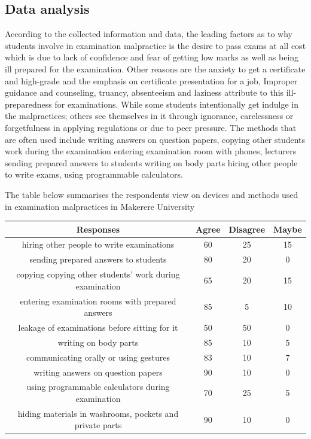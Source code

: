 \documentclass [8 pt]{article}
\begin{document}
\subsection {Data analysis}
According to the collected information and data, the leading factors as to why students involve in examination malpractice is the desire to pass exams at all cost which is due to lack of confidence and fear of getting low marks as well as being ill prepared for the examination. Other reasons are the anxiety to get a certificate and high-grade and the emphasis on certificate presentation for a job, Improper guidance and counseling, truancy, absenteeism and laziness attribute to this ill-preparedness for examinations. 
\newline While some students intentionally get indulge in the malpractices; others see themselves in it through ignorance, carelessness or forgetfulness in applying regulations or due to peer pressure. The methods that are often used include writing answers on question papers, copying other students work during the examination entering examination room with phones, lecturers sending prepared answers to students writing on body parts hiring other people to write exams, using programmable calculators. 

The table below summarises the respondents view on devices and methods used in examination malpractices in Makerere University 

\begin{center}
\begin{tabular}{||c |c |c |c||}
\hline Responses & Agree & Disagree & Maybe\\
[0.5ex]
\hline
\hline  hiring  other people to write examinations  & 60  & 25 & 15 \\
\hline sending prepared answers to students  & 80 & 20& 0\\
\hline copying copying other students' work during examination & 65  & 20 & 15 \\
\hline entering examination rooms with prepared answers & 85 & 5 & 10 \\
\hline leakage of examinations before sitting for it & 50 & 50 & 0  \\
\hline writing on body parts & 85  & 10 & 5 \\
\hline communicating orally or using gestures & 83  & 10 & 7 \\
\hline writing answers on question papers & 90 & 10 &  0 \\
\hline using programmable calculators during examination& 70 & 25 & 5\\
\hline hiding materials in washrooms, pockets and private parts & 90 & 10 & 0  \\
[0.5ex]
\hline 
\end{tabular}
\end{center}
	 
\end{document}
